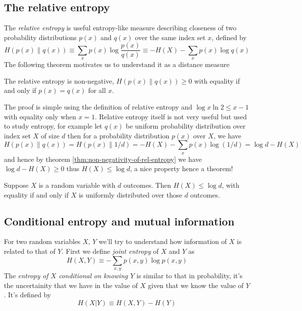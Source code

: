 \subsection{The relative entropy}
The \textit{relative entropy} is useful entropy-like measure describing closeness of two probability distributions $p(x)$ and $q(x)$ over the same index set $x$, defined by
\begin{equation}
    H(p(x) \parallel q(x)) \equiv \sum_x p(x)\log \frac{p(x)}{q(x)} \equiv -H(X)-\sum_x p(x)\log q(x)
\end{equation}
The following theorem motivates us to understand it as a distance measure
\begin{theorem}
    The relative entropy is non-negative, $H(p(x) \parallel q(x)) \geq 0$ with equality if and only if $p(x)=q(x)$ for all $x$.
    \label{thm:non-negativity-of-rel-entropy}
\end{theorem}
The proof is simple using the definition of relative entropy and $\log x \ln{2} \leq x-1$ with equality only when $x=1$. Relative entropy itself is not very useful but used to study entropy, for example let $q(x)$ be uniform probability distribution over index set $X$ of size $d$ then for a probability distribution $p(x)$ over $X$, we have
\begin{equation}
    H(p(x)\parallel q(x)) = H(p(x)\parallel 1/d) = -H(X) - \sum_x p(x) \log (1/d) = \log d - H(X)
\end{equation}
and hence by theorem \ref{thm:non-negativity-of-rel-entropy} we have $\log d - H(X) \geq 0$ thus $H(X) \leq \log d$, a nice property hence a theorem!
\begin{theorem}
    Suppose $X$ is a random variable with $d$ outcomes. Then $H(X) \leq \log d$, with equality if and only if $X$ is uniformly distributed over those $d$ outcomes.
\end{theorem}

\subsection{Conditional entropy and mutual information}
For two random variables $X$, $Y$ we'll try to understand how information of $X$ is related to that of $Y$. First we define \textit{joint entropy} of $X$ and $Y$ as
\begin{equation}
    H(X, Y) \equiv -\sum_{x, y} p(x, y)\log p(x, y)
\end{equation}
The \textit{entropy of $X$ conditional on knowing $Y$} is similar to that in probability, it's the uncertainity that we have in the value of $X$ given that we know the value of $Y$. It's defined by
\begin{equation}
    H(X | Y) \equiv H(X,Y) - H(Y)
\end{equation}

